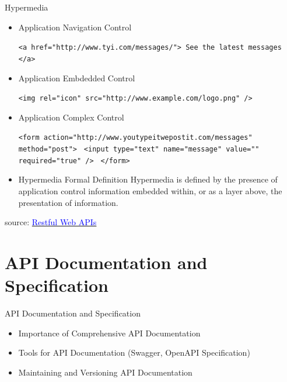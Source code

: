 \documentclass{beamer}
\newcommand{\code}[1]{\colorbox{codegray}{\texttt{#1}}}
\begin{document}
\begin{frame}[t, fragile]{Hypermedia}
		\begin{itemize}
			\item<1-> Application Navigation Control \\
			\scriptsize		
				\begin{semiverbatim}
					\code{<a href="http://www.tyi.com/messages/"> See the latest messages </a>}	
				\end{semiverbatim}
			
			\item<2-> Application Embdedded Control
			\scriptsize		
				\begin{semiverbatim}
					\code{<img rel="icon" src="http://www.example.com/logo.png" />}
				\end{semiverbatim}
			
			\item<3-> Application Complex Control \\
			\scriptsize			
				\begin{semiverbatim}
					\code{<form action="http://www.youtypeitwepostit.com/messages" method="post">}
					\code{	<input type="text" name="message" value="" required="true" /> }
					\code{</form>}
				\end{semiverbatim}
				
			\item<4->[] 
			\scriptsize		
			\begin{block}{Hypermedia Formal Definition}
				Hypermedia is defined by the presence of application control information embedded within, or as a layer above, the presentation of information.
			\end{block}	
		\end{itemize}		

\tiny source: \href{https://www.oreilly.com/library/view/restful-web-apis/9781449359713/} {\textcolor{blue}{Restful Web APIs}} 	
\end{frame}

\section{API Documentation and Specification}
\begin{frame}{API Documentation and Specification}
  \begin{itemize}
    \item Importance of Comprehensive API Documentation
    \item Tools for API Documentation (Swagger, OpenAPI Specification)
    \item Maintaining and Versioning API Documentation
  \end{itemize}
\end{frame}
\end{document}

